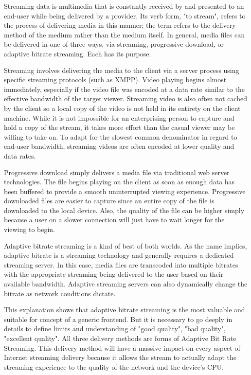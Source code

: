     Streaming data is multimedia that is constantly received by and presented to an end-user while being delivered by a provider. Its verb form, "to stream", refers to the process of delivering media in this manner; the term refers to the delivery method of the medium rather than the medium itself. In general, media files can be delivered in one of three ways, via streaming, progressive download, or adaptive bitrate streaming.  Each has its purpose.

    Streaming involves delivering the media to the client via a server process using specific streaming protocols (such as XMPP).  Video playing begins almost immediately, especially if the video file was encoded at a data rate similar to the effective bandwidth of the target viewer.  Streaming video is also often not cached by the client so a local copy of the video is not held in its entirety on the client machine.  While it is not impossible for an enterprising person to capture and hold a copy of the stream, it takes more effort than the casual viewer may be willing to take on.  To adapt for the slowest common denominator in regard to end-user bandwidth, streaming videos are often encoded at lower quality and data rates.
 
    Progressive download simply delivers a media file via traditional web server technologies.  The file begins playing on the client as soon as enough data has been buffered to provide a smooth uninterrupted viewing experience.  Progressive downloaded files are easier to capture since an entire copy of the file is downloaded to the local device.  Also, the quality of the file can be higher simply because a user on a slower connection will just have to wait longer for the viewing to begin.
  
    Adaptive bitrate streaming is a kind of best of both worlds. As the name implies, adaptive bitrate is a streaming technology and generally requires a dedicated streaming server. In this case, media files are transcoded into multiple bitrates with the appropriate streaming being delivered to the user based on their available bandwidth.  Adaptive streaming servers can also dynamically change the bitrate as network conditions dictate\cite{ilias2013study}.

  This explanation shows that adaptive bitrate streaming is the most valuable and suitable for concept of a generic frontend. But it is necessary to go deeply in details to define limits and understanding of "good quality", "bad quality", "excellent quality". All three delivery methods are forms of Adaptive Bit Rate Streaming. This delivery method will have a massive impact on every aspect of Internet streaming delivery because it allows the stream to actually adapt the streaming experience to the quality of the network and the device's CPU.

